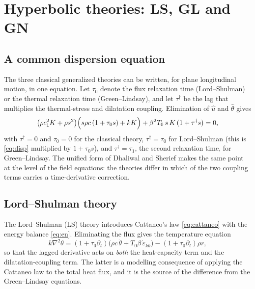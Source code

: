 \section{Hyperbolic theories: LS, GL and GN}\label{sec:hyperbolic}
\subsection{A common dispersion equation}
The three classical generalized theories can be written, for plane longitudinal motion, in one equation. Let $\tau_0$ denote the flux relaxation time (Lord--Shulman) or the thermal relaxation time (Green--Lindsay), and let $\tau^\dagger$ be the lag that multiplies the thermal-stress and dilatation coupling. Elimination of $\hat u$ and $\hat\theta$ gives
\begin{equation}
\bigl(\rho c_1^2K+\rho s^2\bigr)\Bigl(s\rho c\,(1+\tau_0s)+kK\Bigr)+\beta^2T_0\,s\,K\,(1+\tau^\dagger s)=0,\label{eq:unified}
\end{equation}
with $\tau^\dagger=0$ and $\tau_0=0$ for the classical theory, $\tau^\dagger=\tau_0$ for Lord--Shulman (this is \eqref{eq:disp} multiplied by $1+\tau_0s$), and $\tau^\dagger=\tau_1$, the second relaxation time, for Green--Lindsay. The unified form of Dhaliwal and Sherief \citep{Dhaliwal1980} makes the same point at the level of the field equations: the theories differ in which of the two coupling terms carries a time-derivative correction.

\subsection{Lord--Shulman theory}\label{sec:ls}
The Lord--Shulman (LS) theory introduces Cattaneo's law \eqref{eq:cattaneo} with the energy balance \eqref{eq:en}. Eliminating the flux gives the temperature equation
\begin{equation}
k\nabla^2\theta=(1+\tau_0\partial_t)\bigl(\rho c\,\dot\theta+T_0\beta\,\dot\varepsilon_{kk}\bigr)-(1+\tau_0\partial_t)\rho r, \label{eq:LS}
\end{equation}
so that the lagged derivative acts on \emph{both} the heat-capacity term and the dilatation-coupling term. The latter is a modelling consequence of applying the Cattaneo law to the total heat flux, and it is the source of the difference from the Green--Lindsay equations.

